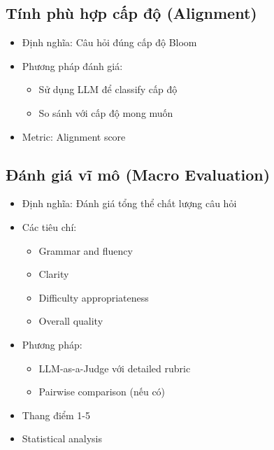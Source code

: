 \begin{itemize}
\subsection{Tính phù hợp cấp độ (Alignment)}
\begin{itemize}
    \item Định nghĩa: Câu hỏi đúng cấp độ Bloom
    \item Phương pháp đánh giá:
    \begin{itemize}
        \item Sử dụng LLM để classify cấp độ
        \item So sánh với cấp độ mong muốn
    \end{itemize}
    \item Metric: Alignment score
\end{itemize}
\end{itemize}

\subsection{Đánh giá vĩ mô (Macro Evaluation)}
\begin{itemize}
    \item Định nghĩa: Đánh giá tổng thể chất lượng câu hỏi
    \item Các tiêu chí:
    \begin{itemize}
        \item Grammar and fluency
        \item Clarity
        \item Difficulty appropriateness
        \item Overall quality
    \end{itemize}
    \item Phương pháp:
    \begin{itemize}
        \item LLM-as-a-Judge với detailed rubric
        \item Pairwise comparison (nếu có)
    \end{itemize}
    \item Thang điểm 1-5
    \item Statistical analysis
\end{itemize}

